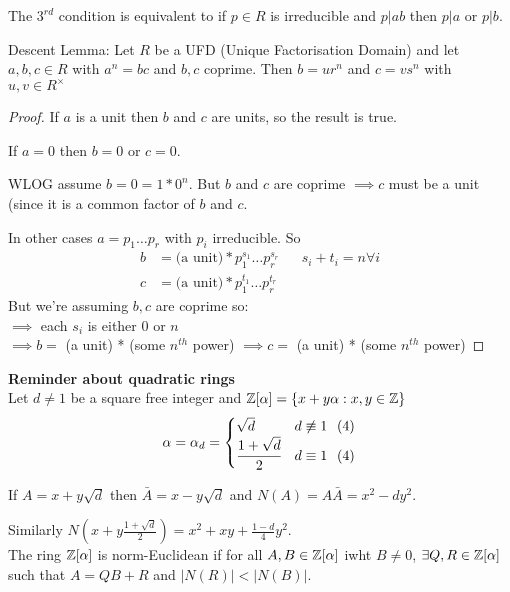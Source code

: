 \documentclass[11pt]{article}
\begin{document}
The $3^{rd}$ condition is equivalent to if $p \in R$ is irreducible and $p|ab $ then $p| a$ or $p | b$.

\begin{lemma}
	Descent Lemma: Let $R$ be a UFD (Unique Factorisation Domain) and let $a,b,c \in R$ with $a^n = bc $ and $b,c$ coprime.
	Then $b = ur^n$ and $c= vs^n$ with $u,v \in R^\times$
\end{lemma}


\begin{proof}
If $a$ is a unit then $b $ and $c$ are units, so the result is true.

If $a=0$ then $b=0$ or $c=0$.

WLOG assume $b=0 = 1*0^n$. 
	But $b$ and $c$ are coprime $\implies c$ must be a unit (since it is a common factor of $b$ and $c$.

	In other cases $a = p_1 \dots p_r $ with $p_i $ irreducible. 
	So 
	\begin{align*}
		b &=  \text{(a unit)} * p_1^{s_1} \dots p_r^{s_r} && s_i + t_i = n \forall i\\
		c &= \text{(a unit)} * p_1^{t_1} \dots p_r^{t_r} 
	\end{align*}
But we're assuming $b,c$ are coprime so:\\
$\implies $ each $s_i $ is either 0 or $n$ \\
	$\implies  b = $ (a unit) * (some $n^{th}$ power)  
	$\implies  c = $ (a unit) * (some $n^{th}$ power)  
\end{proof}
$ $\\
\textbf{Reminder about quadratic rings}\\
Let $d\neq 1$ be a square free integer and $\mathbb{Z}[\alpha] = \{ x+y\alpha : x,y \in \mathbb{Z} \}$
	\begin{equation*}
\alpha = \alpha_d = 
	\begin{cases}
		\sqrt{d} & d\not \equiv 1 \hspace{7pt} (4) \\
		\cfrac{1+\sqrt{d}}{2} & d \equiv 1 \hspace{7pt} (4)
	\end{cases}
	\end{equation*}

If $A = x+y\sqrt{d}$ then $\bar A = x-y \sqrt{d} $ and $N(A) = A \bar A = x^2 - dy^2 $.

Similarly $N(x+y\frac{1+\sqrt{d}}{2}) = x^2 +xy+ \frac{1-d}{4}y^2$.
$ $\\[1em]
The ring $\mathbb{Z}[\alpha]$ is norm-Euclidean if for all $A, B \in \mathbb{Z}[\alpha]$ iwht $B \neq 0$, $ \exists Q, R \in \mathbb{Z}[\alpha]$ such that $A=QB+R$ and $|N(R)| < |N(B)|$.
\end{document}
